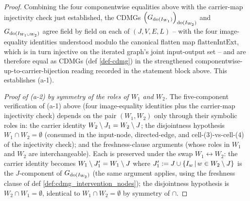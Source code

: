 \documentclass[main]{subfiles}
\providecommand{\flattenIntExt}{\mathrm{flattenIntExt}}
\begin{document}
\begin{proof}
\smallskip
Combining the four componentwise equalities above with the carrier-map injectivity check just established, the CDMGs $\left ( G_{\operatorname{do}(I_{W_1})} \right )_{\operatorname{do}(I_{W_2})}$ and $G_{\operatorname{do}(I_{W_1 \cup W_2})}$ agree field by field on each of $(J, V, E, L)$ -- with the four image-equality identities understood modulo the canonical flatten map $\flattenIntExt$, which is in turn injective on the iterated graph's joint input-output set -- and are therefore equal as CDMGs (def \ref{def-cdmg}) in the strengthened componentwise-up-to-carrier-bijection reading recorded in the statement block above. This establishes (a-1).

\medskip\noindent\emph{Proof of (a-2) by symmetry of the roles of $W_1$ and $W_2$.}
The five-component verification of (a-1) above (four image-equality identities plus the carrier-map injectivity check) depends on the pair $(W_1, W_2)$ only through their symbolic roles in: the carrier identity $W_2 \setminus J_1 = W_2 \setminus J$; the disjointness hypothesis $W_1 \cap W_2 = \emptyset$ (consumed in the input-node, directed-edge, and cell-(3)-vs-cell-(4) of the injectivity check); and the freshness-clause arguments (whose roles in $W_1$ and $W_2$ are interchangeable). Each is preserved under the swap $W_1 \leftrightarrow W_2$: the carrier identity becomes $W_1 \setminus J_1' = W_1 \setminus J$ where $J_1' := J \cup \left \{ I_w \,\middle|\, w \in W_2 \setminus J \right \}$ is the $J$-component of $G_{\operatorname{do}(I_{W_2})}$ (the same argument applies, using the freshness clause of def \ref{def:cdmg_intervention_nodes}); the disjointness hypothesis is $W_2 \cap W_1 = \emptyset$, identical to $W_1 \cap W_2 = \emptyset$ by symmetry of $\cap$.


\end{proof}
\end{document}
